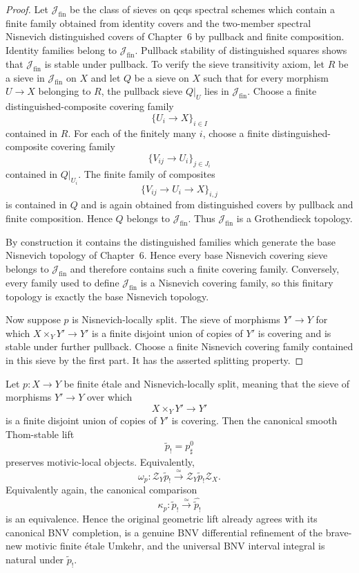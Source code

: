 \begin{proof}
Let $\mathcal J_{\mathrm{fin}}$ be the class of sieves on qcqs spectral
schemes which contain a finite family obtained from identity covers and the
two-member spectral Nisnevich distinguished covers of Chapter~6 by pullback
and finite composition.  Identity families belong to
$\mathcal J_{\mathrm{fin}}$.  Pullback stability of distinguished squares
shows that $\mathcal J_{\mathrm{fin}}$ is stable under pullback.  To verify the
sieve transitivity axiom, let $R$ be a sieve in
$\mathcal J_{\mathrm{fin}}$ on $X$ and let $Q$ be a sieve on $X$ such that
for every morphism $U\to X$ belonging to $R$, the pullback sieve $Q|_U$ lies
in $\mathcal J_{\mathrm{fin}}$.  Choose a finite distinguished-composite
covering family
\[
    \{U_i\to X\}_{i\in I}
\]
contained in $R$.  For each of the finitely many $i$, choose a finite
distinguished-composite covering family
\[
    \{V_{ij}\to U_i\}_{j\in J_i}
\]
contained in $Q|_{U_i}$.  The finite family of composites
\[
    \{V_{ij}\to U_i\to X\}_{i,j}
\]
is contained in $Q$ and is again obtained from distinguished covers by
pullback and finite composition.  Hence $Q$ belongs to
$\mathcal J_{\mathrm{fin}}$.  Thus $\mathcal J_{\mathrm{fin}}$ is a
Grothendieck topology.

By construction it contains the distinguished families which generate the
base Nisnevich topology of Chapter~6.  Hence every base Nisnevich covering
sieve belongs to $\mathcal J_{\mathrm{fin}}$ and therefore contains such a
finite covering family.  Conversely, every family used to define
$\mathcal J_{\mathrm{fin}}$ is a Nisnevich covering family, so this finitary
topology is exactly the base Nisnevich topology.

Now suppose $p$ is Nisnevich-locally split.  The sieve of morphisms
$Y'\to Y$ for which $X\times_YY'\to Y'$ is a finite disjoint union of copies
of $Y'$ is covering and is stable under further pullback.  Choose a finite
Nisnevich covering family contained in this sieve by the first part.  It has
the asserted splitting property.
\end{proof}

\begin{theorem}
\label{thm:bn-diff-locally-split-finite-etale}
Let \(p:X\to Y\) be finite \'etale and Nisnevich-locally split, meaning that
the sieve of morphisms $Y'\to Y$ over which
\[
    X\times_YY'\longrightarrow Y'
\]
is a finite disjoint union of copies of $Y'$ is covering.  Then the canonical
smooth Thom-stable lift
\[
  \widetilde p_!=p_\sharp^0
\]
preserves motivic-local objects.  Equivalently,
\[
  \boxed{
  \omega_p:
  \mathcal Z_Y\widetilde p_!
  \xrightarrow{\simeq}
  \mathcal Z_Y\widetilde p_!\mathcal Z_X.
  }
\]
Equivalently again, the canonical comparison
\[
  \boxed{
  \kappa_p:
  \widetilde p_!
  \xrightarrow{\simeq}
  \widehat{\widetilde p_!}
  }
\]
is an equivalence.  Hence the original geometric lift already agrees with its
canonical BNV completion, is a genuine BNV differential refinement of the
brave-new motivic finite \'etale Umkehr, and the universal BNV interval
integral is natural under \(\widetilde p_!\).
\end{theorem}

